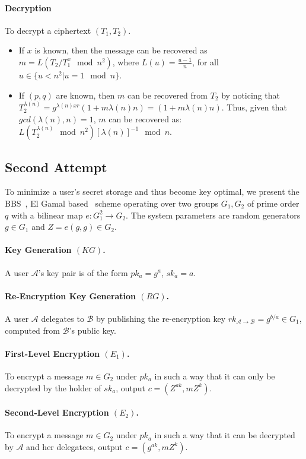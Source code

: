 \documentclass[a4paper,11pt]{article}
\begin{document}
\paragraph{Decryption}
    To decrypt a ciphertext $(T_{1}, T_{2})$.
    \begin{itemize}
      \item If $x$ is known, then the message can be recovered as $m=L(T_{2}/T_{1}^{x} \mod n^{2})$, where $L(u)=\frac{u-1}{n}$, for all $u \in \{u < n^{2} | u=1 \mod n \}$.
      \item If $(p,q)$ are known, then $m$ can be recovered from $T_{2}$ by noticing that $T_{2}^{\lambda(n)}=g^{\lambda(n)xr}(1+m\lambda(n)n)=(1+m\lambda(n)n)$. Thus, given that $gcd(\lambda(n),n) = 1$, $m$ can be recovered as: $L(T_{2}^{\lambda(n)}\mod n^{2})[\lambda(n)]^{-1}\mod n$.
    \end{itemize}
    
\subsection{Second Attempt}\label{sec:three:2}

To minimize a user's secret storage and thus become key optimal, we present the BBS~\cite{Bla-Bleu-Stra}, El Gamal based~\cite{Elgamal} scheme operating over two groups $G_{1},G_{2}$ of prime order $q$ with a bilinear map
$e: G_{1}^{2} \longrightarrow G_{2}$. The system parameters are random generators $g \in G_{1}$ and $Z = e(g,g) \in G_{2}$.

\paragraph{Key Generation $(KG)$.} A user $\mathcal{A}$'s key pair is of the form $pk_{a} = g^{a}$, $sk_{a} = a$.
\paragraph{Re-Encryption Key Generation $(RG)$.} A user $\mathcal{A}$ delegates to $\mathcal{B}$ by publishing the re-encryption key $rk_{\mathcal{A}\rightarrow \mathcal{B}} = g^{b/a} \in G_{1}$, computed from $\mathcal{B}$'s public key.
\paragraph{First-Level Encryption $(E_{1})$.} To encrypt a message $m \in G_{2}$ under $pk_{a}$ in such a way that it can only be decrypted by the holder of $sk_{a}$, output $c = (Z^{ak}, mZ^{k})$.
\paragraph{Second-Level Encryption $(E_{2})$.} To encrypt a message $m \in G_{2}$ under $pk_{a}$ in such a way that it can be decrypted by $\mathcal{A}$ and her delegatees, output $c = (g^{ak}, mZ^{k})$.
\end{document}
